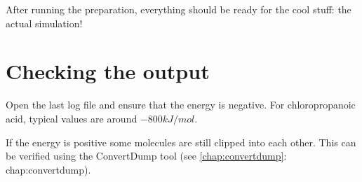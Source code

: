 
After running the preparation, everything should be ready for the cool stuff: 
the actual simulation!

\section{Checking the output}
Open the last log file and ensure that the energy is negative. For 
chloropropanoic acid, typical values are around $-800 kJ/mol$.

If the energy is positive some molecules are still clipped into each other. 
This can be verified using the ConvertDump tool (see \ref{chap:convertdump}: 
\refname{chap:convertdump}).